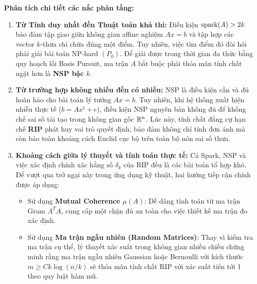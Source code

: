 \textbf{Phân tích chi tiết các nấc phân tầng:}
\begin{enumerate}
    \item \textbf{Từ Tính duy nhất đến Thuật toán khả thi:} Điều kiện $\operatorname{spark}(A) > 2k$ bảo đảm tập giao giữa không gian affine nghiệm $Ax = b$ và tập hợp các vector $k$-thưa chỉ chứa đúng một điểm. Tuy nhiên, việc tìm điểm đó đòi hỏi phải giải bài toán NP-hard $(P_0)$. Để giải được trong thời gian đa thức bằng quy hoạch lồi Basis Pursuit, ma trận $A$ bắt buộc phải thỏa mãn tính chất ngặt hơn là \textbf{NSP bậc $k$}.
    \item \textbf{Từ trường hợp không nhiễu đến có nhiễu:} NSP là điều kiện cần và đủ hoàn hảo cho bài toán lý tưởng $Ax = b$. Tuy nhiên, khi hệ thống xuất hiện nhiễu thực tế ($b = Ax^\natural + e$), điều kiện NSP nguyên bản không đủ để khống chế sai số tái tạo trong không gian gốc $\mathbb{R}^n$. Lúc này, tính chất đẳng cự hạn chế \textbf{RIP} phát huy vai trò quyết định, bảo đảm không chỉ tính đơn ánh mà còn bảo toàn khoảng cách Euclid cục bộ trên toàn bộ nón sai số thưa.
    \item \textbf{Khoảng cách giữa lý thuyết và tính toán thực tế:} Cả Spark, NSP và việc xác định chính xác hằng số $\delta_k$ của RIP đều là các bài toán tổ hợp khó. Để vượt qua trở ngại này trong ứng dụng kỹ thuật, hai hướng tiếp cận chính được áp dụng:
    \begin{itemize}
        \item Sử dụng \textbf{Mutual Coherence $\mu(A)$}: Dễ dàng tính toán từ ma trận Gram $A^T A$, cung cấp một chặn đủ an toàn cho việc thiết kế ma trận đo xác định.
        \item Sử dụng \textbf{Ma trận ngẫu nhiên (Random Matrices)}: Thay vì kiểm tra ma trận cụ thể, lý thuyết xác suất trong không gian nhiều chiều chứng minh rằng ma trận ngẫu nhiên Gaussian hoặc Bernoulli với kích thước $m \ge C k \log(n/k)$ sẽ thỏa mãn tính chất RIP với xác suất tiến tới 1 theo quy luật hàm mũ.
    \end{itemize}
\end{enumerate}

